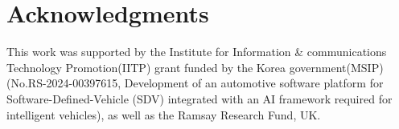 \section{Acknowledgments}

This work was supported by the Institute for Information \& communications Technology Promotion(IITP) grant funded by the Korea government(MSIP) (No.RS-2024-00397615, Development of an automotive software platform for Software-Defined-Vehicle (SDV) integrated with an AI framework required for intelligent vehicles), as well as the Ramsay Research Fund, UK.